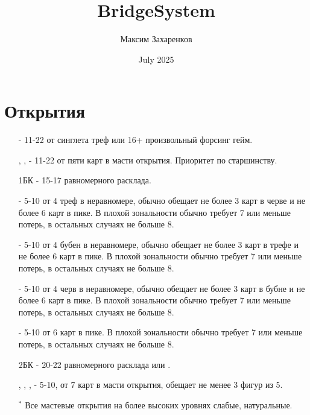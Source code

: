 \documentclass{article}
\title{BridgeSystem}
\author{Максим Захаренков}
\date{July 2025}
\begin{document}
\Large
\section{Открытия}
\begin{enumerate}
    \item[\cl{1}] - 11-22 от синглета треф или 16+ произвольный форсинг гейм.
    \item[\di{1}, \he{1}, \sp{1}] - 11-22 от пяти карт в масти открытия. Приоритет по старшинству.
    \item[1БК] - 15-17 равномерного расклада.
    \item[\cl{2}] - 5-10 от 4 треф в неравномере, обычно обещает не более 3 карт в черве и не более 6 карт в пике. В плохой зональности обычно требует 7 или меньше потерь, в остальных случаях не больше 8.
    \item[\di{2}] - 5-10 от 4 бубен в неравномере, обычно обещает не более 3 карт в трефе и не более 6 карт в пике. В плохой зональности обычно требует 7 или меньше потерь, в остальных случаях не больше 8.
    \item[\he{2}] - 5-10 от 4 черв в неравномере, обычно обещает не более 3 карт в бубне и не более 6 карт в пике. В плохой зональности обычно требует 7 или меньше потерь, в остальных случаях не больше 8.
    \item[\sp{2}] - 5-10 от 6 карт в пике. В плохой зональности обычно требует 7 или меньше потерь, в остальных случаях не больше 8.
    \item[2БК] - 20-22 равномерного расклада или .
    \item[\cl{3}, \di{3}, \he{3}, \sp{3}] - 5-10, от 7 карт в масти открытия, обещает не менее 3 фигур из 5.
    \item[$^*$] Все мастевые открытия на более высоких уровнях слабые, натуральные.
\end{enumerate}
\end{document}
